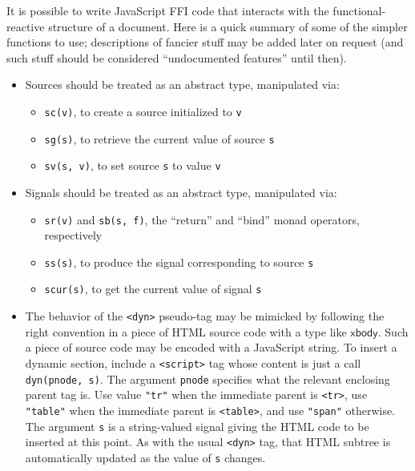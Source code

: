 \documentclass{article}
\newcommand{\cd}[1]{\texttt{#1}}
\newcommand{\mt}[1]{\mathsf{#1}}
\begin{document}
It is possible to write JavaScript FFI code that interacts with the functional-reactive structure of a document.  Here is a quick summary of some of the simpler functions to use; descriptions of fancier stuff may be added later on request (and such stuff should be considered ``undocumented features'' until then).

\begin{itemize}
\item Sources should be treated as an abstract type, manipulated via:
  \begin{itemize}
  \item \cd{sc(v)}, to create a source initialized to \cd{v}
  \item \cd{sg(s)}, to retrieve the current value of source \cd{s}
  \item \cd{sv(s, v)}, to set source \cd{s} to value \cd{v}
  \end{itemize}

\item Signals should be treated as an abstract type, manipulated via:
  \begin{itemize}
  \item \cd{sr(v)} and \cd{sb(s, f)}, the ``return'' and ``bind'' monad operators, respectively
  \item \cd{ss(s)}, to produce the signal corresponding to source \cd{s}
  \item \cd{scur(s)}, to get the current value of signal \cd{s}
  \end{itemize}

\item The behavior of the \cd{<dyn>} pseudo-tag may be mimicked by following the right convention in a piece of HTML source code with a type like $\mt{xbody}$.  Such a piece of source code may be encoded with a JavaScript string.  To insert a dynamic section, include a \cd{<script>} tag whose content is just a call \cd{dyn(pnode, s)}.  The argument \cd{pnode} specifies what the relevant enclosing parent tag is.  Use value \cd{"tr"} when the immediate parent is \cd{<tr>}, use \cd{"table"} when the immediate parent is \cd{<table>}, and use \cd{"span"} otherwise.  The argument \cd{s} is a string-valued signal giving the HTML code to be inserted at this point.  As with the usual \cd{<dyn>} tag, that HTML subtree is automatically updated as the value of \cd{s} changes.


\end{itemize}
\end{document}
